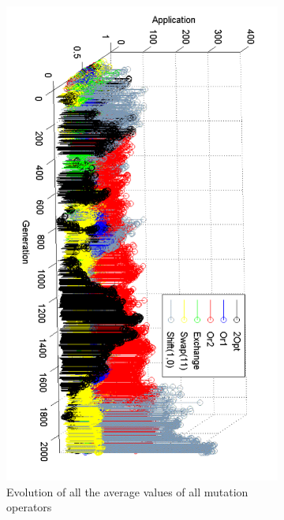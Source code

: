 \documentclass{endm}
\begin{document}
\begin{figure}[t!]
    \centering
    \begin{subfigure}[b]{0.5\textwidth}
        \centering
        \includegraphics[angle=90,width=\textwidth]{./figs/HFVRP/VRPAll.pdf}
        \caption{Evolution of all the average values of all mutation operators \label{fig:VRPAll}}
    \end{subfigure}%
     ~
    \begin{subfigure}[b]{0.49\textwidth}

\end{subfigure}
\end{figure}
\end{document}
